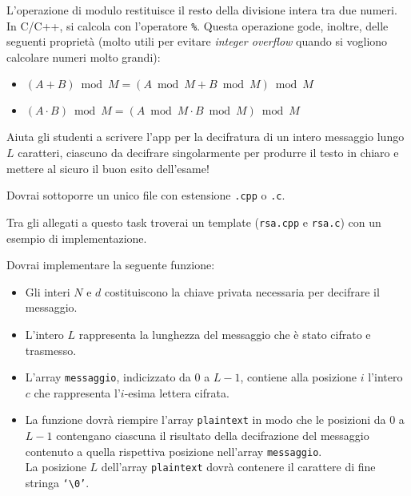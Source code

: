       \begin{warning}
      L'operazione di modulo restituisce il resto della divisione intera tra due numeri. In C/C++, si calcola con l'operatore \texttt{\%}. Questa operazione gode, inoltre, delle seguenti proprietà (molto utili per evitare \emph{integer overflow} quando si vogliono calcolare numeri molto grandi):
      \begin{itemize}[nolistsep]
                  \item $(A + B) \bmod M = (A \bmod M + B \bmod M) \bmod M$
                  \item $(A \cdot B) \bmod M = (A \bmod M \cdot B \bmod M) \bmod M$
      \end{itemize}
      \end{warning}
    
      Aiuta gli studenti a scrivere l'app per la decifratura di un intero messaggio lungo $L$ caratteri, ciascuno da decifrare singolarmente per produrre il testo in chiaro e mettere al sicuro il buon esito dell'esame!
      
\Implementation
Dovrai sottoporre un unico file con estensione \texttt{.cpp} o \texttt{.c}.

\begin{warning}
Tra gli allegati a questo task troverai un template (\texttt{rsa.cpp} e \texttt{rsa.c}) con un esempio di implementazione.
\end{warning}

Dovrai implementare la seguente funzione:

\begin{itemize}[nolistsep]

    \begin{itemize}[nolistsep]
        \item Gli interi $N$ e $d$ costituiscono la chiave privata necessaria per decifrare il messaggio.
        \item L'intero $L$ rappresenta la lunghezza del messaggio che è stato cifrato e trasmesso.
        \item L'array \texttt{messaggio}, indicizzato da $0$ a $L-1$, contiene alla posizione $i$ l'intero $c$ che rappresenta l'$i$-esima lettera cifrata.
        \item La funzione dovrà riempire l'array \texttt{plaintext} in modo che le posizioni da $0$ a $L-1$ contengano ciascuna il risultato della decifrazione del messaggio contenuto a quella rispettiva posizione nell'array \texttt{messaggio}. \\ La posizione $L$ dell'array \texttt{plaintext} dovrà contenere il carattere di fine stringa \texttt{`\textbackslash 0'}.

    \end{itemize}
\end{itemize}


